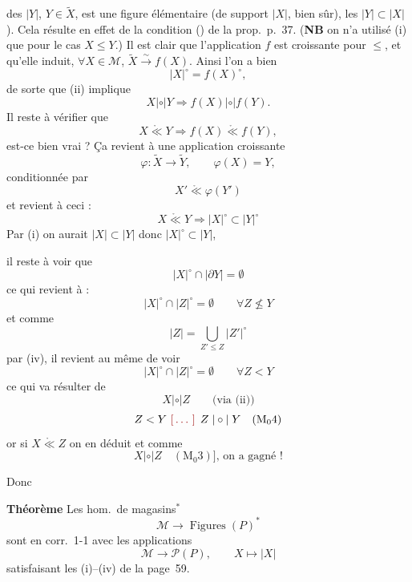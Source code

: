 \documentclass[11pt,a4paper]{article}
\begin{document}
des $|Y|$, $Y \in \widetilde{X}$, est une figure élémentaire (de support $|X|$, bien sûr),  \ill{} les $|Y| \subset |X|$). Cela résulte en effet de la condition () de la prop.\ p.~37. (\textbf{NB} on n'a utilisé (i) que pour le cas $X \leq Y$.) Il est clair que l'application $f$ est croissante pour $\leq$, et qu'elle induit, $\forall X \in \mathcal{M}$, $\widetilde{X} \xrightarrow{\sim} f(X)$. Ainsi \struck{\ill{}} l'on a bien
\[
  |X|^{\circ} = f(X)^{\circ},
\]
de sorte que (ii) implique 
\[
  X \mathrel{|\circ|} Y \Longrightarrow f(X) \mathrel{|\circ|} f(Y).
\]
Il reste à vérifier que
\[
  X \mathrel{\mathring{\ll}} Y \Longrightarrow f(X) \mathrel{\mathring{\ll}} f(Y),
\]
 est-ce bien vrai ? Ça revient à une application croissante
\[
  \varphi : \widetilde{X} \longrightarrow \widetilde{Y}, \qquad \varphi(X) = Y,
\]
 conditionnée par
\[
  X' \mathrel{\mathring{\ll}} \varphi(Y')
\]
et \struck{\ill{}} revient à ceci :
\[
  X \mathrel{\mathring{\ll}} Y \Longrightarrow |X|^{\circ} \subset |Y|^{\circ}
\]
 Par (i) on aurait $|X| \subset |Y|$ donc $|X|^{\circ} \subset |Y|$,

il reste à voir que
\[
  |X|^{\circ} \cap |\partial Y| = \emptyset
\]
ce qui revient à :
\[
  |X|^{\circ} \cap |Z|^{\circ} = \emptyset \qquad \forall Z \not\leq Y
\]
 \struck{(\ill{}} et comme
\[
  |Z| = \bigcup_{Z' \leq Z} |Z'|^{\circ}
\]
par (iv), il revient au même de voir
\[
  |X|^{\circ} \cap |Z|^{\circ} = \emptyset \qquad \forall Z < Y
\]
ce qui va résulter de
\[
  X \mathrel{|\circ|} Z \qquad \text{(via (ii))}
\]
\[
  Z < Y \text{ \ill{} } Z \mathrel{|\circ|} Y \quad (\mathrm{M}_0 4)
\]
or si $X \mathrel{\mathring{\ll}} Z$ \ill{} on en déduit
et comme \ill{}
\[
  X \mathrel{|\circ|} Z \quad (\mathrm{M}_0 3)\text{], on a gagné !}
\]

Donc

\textbf{Théorème} Les hom.\ de magasins${}^{*}$
\[
  \mathcal{M} \longrightarrow \operatorname{Figures}(P)^{*}
\]
sont en corr.\ 1-1 avec les applications
\[
  \mathcal{M} \longrightarrow \mathcal{P}(P), \qquad X \longmapsto |X|
\]
satisfaisant les   (i)--(iv) de la page~59.
\end{document}
